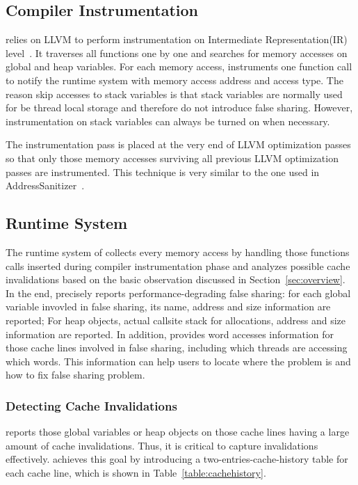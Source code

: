 \subsection{Compiler Instrumentation}
\label{sec:compiler}

\Predator{} relies on LLVM to perform instrumentation on Intermediate Representation(IR) level~\cite{llvm}.
It traverses all functions one by one and 
searches for memory accesses on global and heap variables. 
For each memory access, \Predator{} instruments one function call to 
notify the runtime system with memory access address and access type.
The reason \Predator{} skip accesses to stack variables 
is that stack variables are normally used for be thread local storage and
therefore do not introduce false sharing. However, instrumentation on stack
variables can always be turned on when necessary. 

The instrumentation pass is placed at the very end of LLVM optimization passes 
so that only those memory accesses surviving all previous 
LLVM optimization passes are instrumented. 
This  technique is very similar to the one used in AddressSanitizer~\cite{Addresssanitizer}.

\subsection{Runtime System}
\label{sec:runtime}
The runtime system of \Predator{} collects every memory access by handling 
those functions calls inserted during compiler instrumentation phase and analyzes
possible cache invalidations based on the basic observation discussed in Section~\ref{sec:overview}.
In the end, \Predator{} precisely reports performance-degrading false sharing:
for each global variable invovled in false sharing, its name, address and size
information are reported; For heap objects, actual callsite stack for allocations, address 
and size information are reported.
In addition, \Predator{} provides word accesses information for those cache lines 
involved in false sharing, including which threads are accessing which words. 
This information can help 
users to locate where the problem is and how to fix false sharing problem.

\subsubsection{Detecting Cache Invalidations}
\Predator{} reports those global variables or heap objects on those cache lines 
having a large amount of cache invalidations. 
Thus, it is critical to capture invalidations effectively. 
\Predator{} achieves this goal by introducing a  
two-entries-cache-history table for each cache line, which is 
shown in Table~\ref{table:cachehistory}. 

